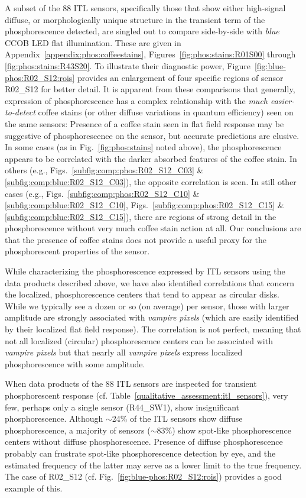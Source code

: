 A subset of the 88 ITL sensors, specifically those that show either high-signal diffuse, or morphologically unique structure in the transient term of the phosphorescence detected, are singled out to compare side-by-side with {\it blue} CCOB LED flat illumination. These are given in Appendix~\ref{appendix:phos:coffeestains}, Figures~\ref{fig:phos:stains:R01S00} through \ref{fig:phos:stains:R43S20}. To illustrate their diagnostic power, Figure~\ref{fig:blue-phos:R02_S12:rois} provides an enlargement of four specific regions of sensor R02\_S12 for better detail. It is apparent from these comparisons that generally, expression of phosphorescence has a complex relationship with the {\it much easier-to-detect} coffee stains (or other diffuse variations in quantum efficiency) seen on the same sensors: Presence of a coffee stain seen in flat field response may be suggestive of phosphorescence on the sensor, but accurate predictions are elusive.  In some cases (as in Fig.~\ref{fig:phos:stains} noted above), the phosphorescence appears to be correlated with the darker absorbed features of the coffee stain. In others (e.g., Figs.~\ref{subfig:comp:phos:R02_S12_C03} \& \ref{subfig:comp:blue:R02_S12_C03}), the opposite correlation is seen. In still other cases (e.g., Figs.~\ref{subfig:comp:phos:R02_S12_C10} \& \ref{subfig:comp:blue:R02_S12_C10}, Figs.~\ref{subfig:comp:phos:R02_S12_C15} \& \ref{subfig:comp:blue:R02_S12_C15}), there are regions of strong detail in the phosphorescence without very much coffee stain action at all. Our conclusions are that the presence of coffee stains does not provide a useful proxy for the phosphorescent properties of the sensor.




While characterizing the phosphorescence expressed by ITL sensors using the data products described above, we have also identified correlations that concern the localized, phosphorescence centers that tend to appear as circular disks. While we typically see a dozen or so (on average) per sensor, those with larger amplitude are strongly associated with {\it vampire pixels} (which are easily identified by their localized flat field response). The correlation is not perfect, meaning that not all localized (circular) phosphorescence centers can be associated with {\it vampire pixels} but that nearly all {\it vampire pixels} express localized phosphorescence with some amplitude.

When data products of the 88 ITL sensors are inspected for transient phosphorescent response (cf. Table~\ref{qualitative_assessment:itl_sensors}), very few, perhaps only a single sensor (R44\_SW1), show insignificant phosphorescence. Although $\sim$24\% of the ITL sensors show diffuse phosphorescence, a majority of sensors ($\sim$83\%) show spot-like phosphorescence centers without diffuse phosphorescence. Presence of diffuse phosphorescence probably can frustrate spot-like phosphorescence detection by eye, and the estimated frequency of the latter may serve as a lower limit to the true frequency. The case of R02\_S12 (cf. Fig.~\ref{fig:blue-phos:R02_S12:rois}) provides a good example of this.

